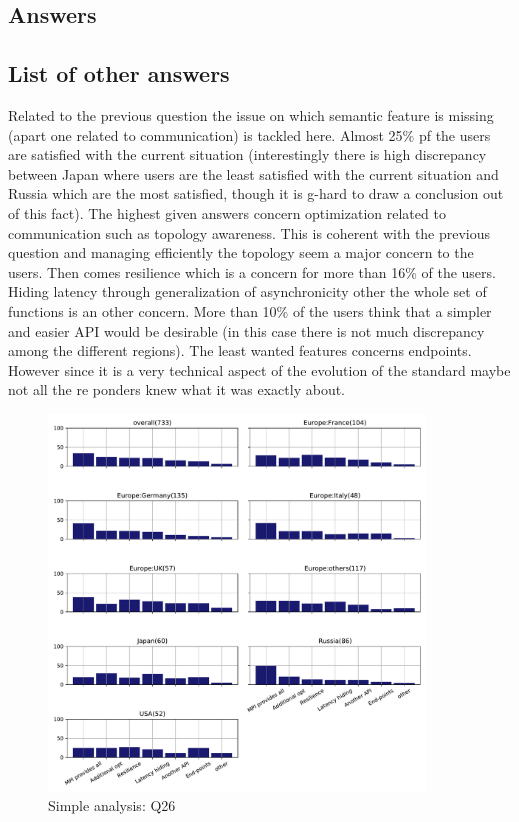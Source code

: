 
\subsection{Answers}


\subsection{List of other answers}
\begin{itemize}

\end{itemize}

Related to the previous question the issue on which semantic feature is missing
(apart one related to communication) is tackled here. Almost 25\% pf the
users are satisfied with the current situation (interestingly there is high
discrepancy between Japan where users are the least satisfied with the current
situation and Russia which are the most satisfied, though it is g-hard to draw a
conclusion out of this fact). The highest given answers
concern optimization related to communication such as topology awareness. This
is coherent with the previous question and managing efficiently the topology seem
a major concern to the users. Then comes resilience which is a concern for more
than 16\% of the users. Hiding latency through generalization of asynchronicity
other the whole set of functions is an other concern. More than 10\% of the
users think that a simpler and easier API would be desirable (in this case there
is not much discrepancy among the different regions).  The least wanted features
concerns endpoints. However since it is a very technical aspect of the evolution
of the standard maybe not all the re ponders knew what it was exactly about.  

\begin{figure}[htb]
\begin{center}
\includegraphics[width=10cm]{../pdfs/Q26.pdf}
\caption{Simple analysis: Q26}
\label{fig:Q26}
\end{center}
\end{figure}
